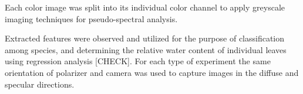 Each color image was split into its individual color channel to apply greyscale imaging techniques for pseudo-spectral analysis.

Extracted features were observed and utilized for the purpose of classification among species, and determining the relative water content of individual leaves using regression analysis [CHECK].  For each type of experiment the same orientation of polarizer and camera was used to capture images in the diffuse and specular directions.
